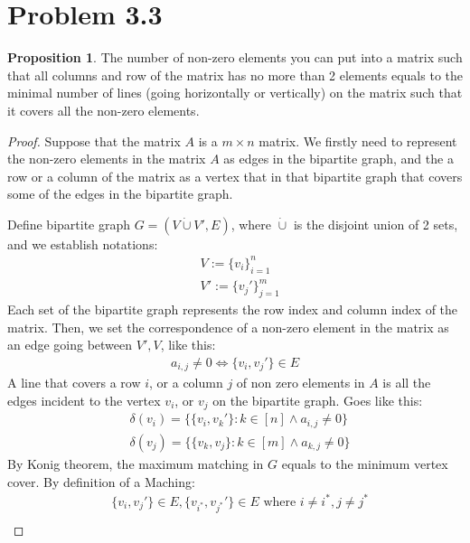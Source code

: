 \documentclass[]{article}
\theoremstyle{definition}
\newtheorem{prop}{Proposition}[section]  %
\begin{document}
\section{Problem 3.3}
    \begin{prop}
        The number of non-zero elements you can put into a matrix such that all columns and row of the matrix has no more than 2 elements equals to the minimal number of lines (going horizontally or vertically) on the matrix such that it covers all the non-zero elements. 
    \end{prop}
    \begin{proof}
        Suppose that the matrix $A$ is a $m\times n$ matrix. We firstly need to represent the non-zero elements in the matrix $A$ as edges in the bipartite graph, and the a row or a column of the matrix as a vertex that in that bipartite graph that covers some of the edges in the bipartite graph. 
        \par
        Define bipartite graph $G = (V \dot{\cup}V', E)$, where $\dot{\cup}$ is the disjoint union of 2 sets, and we establish notations: 
        \begin{align}
            & V := \{v_i\}_{i = 1}^{n}
            \\
            & V' := \{v_j'\}_{j = 1}^{m}
        \end{align}
        Each set of the bipartite graph represents the row index and column index of the matrix. Then, we set the correspondence of a non-zero element in the matrix as an edge going between $V', V$, like this: 
        \begin{align}
            a_{i, j} \neq 0 \iff \{v_i, v_j'\} \in E
        \end{align}
        A line that covers a row $i$, or a column $j$ of non zero elements in $A$ is all the edges incident to the vertex $v_i$, or $v_j$ on the bipartite graph. Goes like this: 
        \begin{align}
            & \delta(v_i) = \{\{v_i, v_k'\}: k\in [n] \wedge a_{i, j} \neq 0\}
            \\
            & \delta(v_j) = \{\{v_k, v_j\}: k \in [m] \wedge a_{k, j} \neq 0\}
        \end{align}
        By Konig theorem, the maximum matching in $G$ equals to the minimum vertex cover. By definition of a Maching: 
        \begin{align}
            &\{v_{i}, v_{j}'\} \in E, \{v_{i^*}, v_{j^*}'\} \in E \text{ where } i\neq i^{*}, j \neq j^{*} 
            \\

\end{align}
\end{proof}
\end{document}
